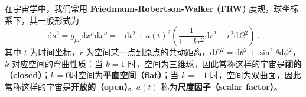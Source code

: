 


在宇宙学中，我们常用 \textbf{Friedmann-Robertson-Walker (FRW)} 度规，球坐标系下，其一般形式为
\begin{equation}
\mathrm{d}s^2=g_{\mu\nu}\mathrm{d}x^{\mu}\mathrm{d}x^{\nu}=-\mathrm{d}t^2+a(t)^2 \left( \frac{1}{1-kr^2}\mathrm{d}r^2+r^2 \mathrm{d} \Omega^2\right)~.
\end{equation}
其中 $t$ 为时间坐标，$r$ 为空间某一点到原点的共动距离，$\mathrm{d} \Omega^2 =\mathrm{d} \theta^2 + \sin^2\theta\mathrm{d} \phi^2 $，$k$ 对应空间的弯曲性质：当 $k=1$ 时，空间为三维球，因此常称这样的宇宙是\textbf{闭的（closed）}；$k=0$时空间为\textbf{平直空间（flat）}；当 $k=-1$ 时，空间为双曲面，因此常称这样的宇宙是\textbf{开放的（open）}。$a(t)$ 称为\textbf{尺度因子（scalar factor）}。
